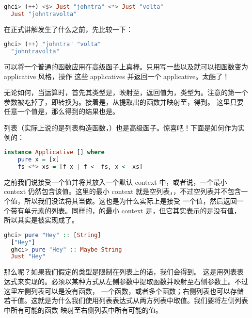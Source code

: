 \documentclass[./main.tex]{subfiles}
\begin{document}
\begin{lstlisting}[language=Haskell]
  ghci> (++) <$> Just "johntra" <*> Just "volta"
  Just "johntravolta"
\end{lstlisting}

在正式讲解发生了什么之前，先比较一下：

\begin{lstlisting}[language=Haskell]
  ghci> (++) "johntra" "volta"
  "johntravolta"
\end{lstlisting}

可以将一个普通的函数应用在高级函子上真棒。只用写一些\acode{<\$>}以及\acode{<*>}就可以把函数变为 applicative 风格，操作
这些 applicatives 并返回一个 applicative。太酷了！

无论如何，当运算时，首先\acode{(++)}其类型是\acode{(++) :: [a]
-> [a] -> [a]}，映射至，返回值为，类型为。注意\acode{(++)}的第一个参数被吃掉了，即转换为。接着是，从提取出的函数并映射至，得到。
这里只要任意一个值是，那么得到的结果也是。

列表（实际上说的是列表构造函数，\acode{[]}）也是高级函子。惊喜吧！下面是\acode{[]}如何作为实例的：

\begin{lstlisting}[language=Haskell]
  instance Applicative [] where
    pure x = [x]
    fs <*> xs = [f x | f <- fs, x <- xs]
\end{lstlisting}

之前我们说接受一个值并将其放入一个默认 context 中，或者说，一个最小 context 仍然包含该值。这里的最小 context
就是空列表，\acode{[]}，不过空列表并不包含一个值，所以我们没法将其当做。这也是为什么实际上是接受
一个值，然后返回一个带有单元素的列表。同样的，的最小 context 是，但它其实表示的是没有值，
所以其实是被实现成了。

\begin{lstlisting}[language=Haskell]
  ghci> pure "Hey" :: [String]
  ["Hey"]
  ghci> pure "Hey" :: Maybe String
  Just "Hey"
\end{lstlisting}

那么\acode{<*>}呢？如果我们假定\acode{<*>}的类型是限制在列表上的话，我们会得到\acode{(<*>) :: [a -> b]-> [a]  -> [b]}。
这是用列表表达式来实现的。\acode{<*>}必须以某种方式从左侧参数中提取函数并映射至右侧参数上。不过这里左侧列表可以是没有函数，
一个函数，或者多个函数；右侧列表也可以存储若干值。这就是为什么我们使用列表表达式从两方列表中取值。我们要将左侧列表中所有可能的函数
映射至右侧列表中所有可能的值。
\end{document}
